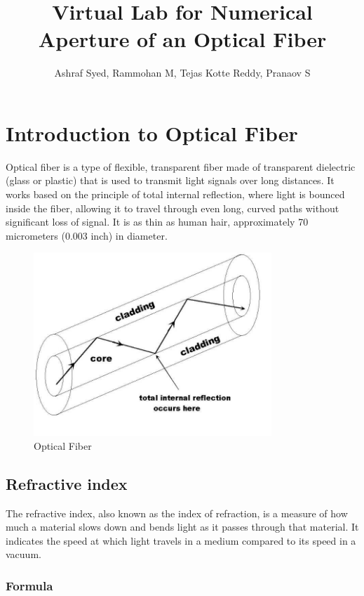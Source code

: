 \documentclass{article}
\title{Virtual Lab for Numerical Aperture of an Optical Fiber}
\author{Ashraf Syed, Rammohan M, Tejas Kotte Reddy, Pranaov S}
\theoremstyle{mytheoremstyle}
\theoremstyle{mytheoremstyle}
\theoremstyle{myproblemstyle}
\begin{document}
\maketitle
\tableofcontents
\newpage


\section{Introduction to Optical Fiber}


Optical fiber is a type of flexible, transparent fiber made of transparent dielectric (glass or plastic) that is used to transmit light signals over long distances. It works based on the principle of total internal reflection, where light is bounced inside the fiber, allowing it to travel through even long, curved paths without significant loss of signal. It is as thin as human hair, approximately 70 micrometers (0.003 inch) in diameter.


\begin{figure}[h]
    \centering
    \includegraphics[width=0.8\textwidth]{./assets/optical-fiber.jpg}
    \caption{Optical Fiber}
    \label{fig:optical-fiber}
\end{figure}

\subsection{Refractive index}


The refractive index, also known as the index of refraction, is a measure of how much a material slows down and bends light as it passes through that material. It indicates the speed at which light travels in a medium compared to its speed in a vacuum.

\subsubsection{Formula}
\end{document}
